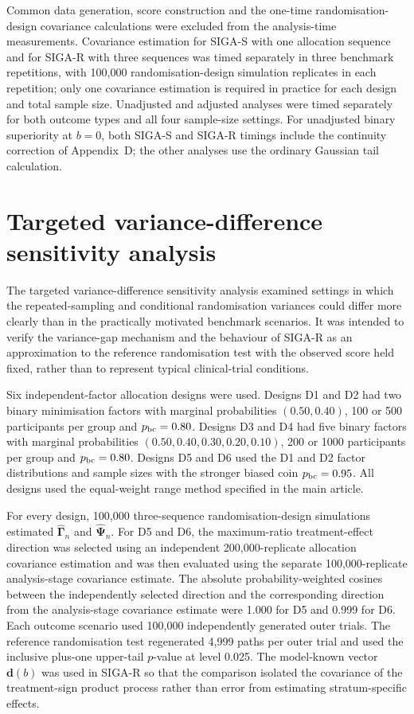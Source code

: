 \documentclass[12pt,a4paper]{article}
\theoremstyle{definition}
\theoremstyle{remark}\newtheorem{remark}{Remark}
\numberwithin{equation}{section}
\begin{document}
Common data generation, score construction and the one-time randomisation-design covariance calculations were excluded from the analysis-time measurements. Covariance estimation for SIGA-S with one allocation sequence and for SIGA-R with three sequences was timed separately in three benchmark repetitions, with 100,000 randomisation-design simulation replicates in each repetition; only one covariance estimation is required in practice for each design and total sample size. Unadjusted and adjusted analyses were timed separately for both outcome types and all four sample-size settings. For unadjusted binary superiority at $b=0$, both SIGA-S and SIGA-R timings include the continuity correction of Appendix~D; the other analyses use the ordinary Gaussian tail calculation.


\clearpage

\section{Targeted variance-difference sensitivity analysis}\label{sec:supp-variance-validation}

The targeted variance-difference sensitivity analysis examined settings in which the repeated-sampling and conditional randomisation variances could differ more clearly than in the practically motivated benchmark scenarios. It was intended to verify the variance-gap mechanism and the behaviour of SIGA-R as an approximation to the reference randomisation test with the observed score held fixed, rather than to represent typical clinical-trial conditions.

Six independent-factor allocation designs were used. Designs D1 and D2 had two binary minimisation factors with marginal probabilities $(0.50,0.40)$, 100 or 500 participants per group and $p_{\rm bc}=0.80$. Designs D3 and D4 had five binary factors with marginal probabilities $(0.50,0.40,0.30,0.20,0.10)$, 200 or 1000 participants per group and $p_{\rm bc}=0.80$. Designs D5 and D6 used the D1 and D2 factor distributions and sample sizes with the stronger biased coin $p_{\rm bc}=0.95$. All designs used the equal-weight range method specified in the main article.

For every design, 100,000 three-sequence randomisation-design simulations estimated $\widehat{\bm\Gamma}_n$ and $\widehat{\bm\Psi}_n$. For D5 and D6, the maximum-ratio treatment-effect direction was selected using an independent 200,000-replicate allocation covariance estimation and was then evaluated using the separate 100,000-replicate analysis-stage covariance estimate. The absolute probability-weighted cosines between the independently selected direction and the corresponding direction from the analysis-stage covariance estimate were 1.000 for D5 and 0.999 for D6. Each outcome scenario used 100,000 independently generated outer trials. The reference randomisation test regenerated 4,999 paths per outer trial and used the inclusive plus-one upper-tail $p$-value at level 0.025. The model-known vector $\bm d(b)$ was used in SIGA-R so that the comparison isolated the covariance of the treatment-sign product process rather than error from estimating stratum-specific effects.
\end{document}
